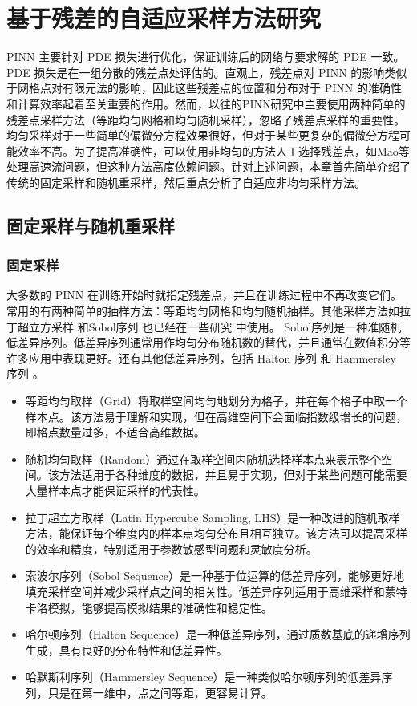 \chapter{基于残差的自适应采样方法研究}

PINN 主要针对 PDE 损失进行优化，保证训练后的网络与要求解的 PDE 一致。 PDE 损失是在一组分散的残差点处评估的。直观上，残差点对 PINN 的影响类似于网格点对有限元法的影响，因此这些残差点的位置和分布对于 PINN 的准确性和计算效率起着至关重要的作用。然而，以往的PINN研究中主要使用两种简单的残差点采样方法（等距均匀网格和均匀随机采样），忽略了残差点采样的重要性。均匀采样对于一些简单的偏微分方程效果很好，但对于某些更复杂的偏微分方程可能效率不高。为了提高准确性，可以使用非均匀的方法人工选择残差点，如Mao等 \cite{mao2020physics}处理高速流问题，但这种方法高度依赖问题。针对上述问题，本章首先简单介绍了传统的固定采样和随机重采样，然后重点分析了自适应非均匀采样方法。

\section{固定采样与随机重采样}

\subsection{固定采样}

大多数的 PINN 在训练开始时就指定残差点，并且在训练过程中不再改变它们。常用的有两种简单的抽样方法：等距均匀网格和均匀随机抽样。其他采样方法如拉丁超立方采样 \cite{stein1987large}和Sobol序列 \cite{sobol1967distribution}也已经在一些研究 \cite{raissi2019physics,pang2019fpinns}中使用。 Sobol序列是一种准随机低差异序列。低差异序列通常用作均匀分布随机数的替代，并且通常在数值积分等许多应用中表现更好。还有其他低差异序列，包括 Halton 序列 \cite{halton1960efficiency}和 Hammersley 序列 \cite{hammersley1964monte}。

\begin{itemize}
    \item 等距均匀取样（Grid）将取样空间均匀地划分为格子，并在每个格子中取一个样本点。该方法易于理解和实现，但在高维空间下会面临指数级增长的问题，即格点数量过多，不适合高维数据。
    \item 随机均匀取样（Random）通过在取样空间内随机选择样本点来表示整个空间。该方法适用于各种维度的数据，并且易于实现，但对于某些问题可能需要大量样本点才能保证采样的代表性。
    \item 拉丁超立方取样（Latin Hypercube Sampling, LHS）是一种改进的随机取样方法，能保证每个维度内的样本点均匀分布且相互独立。该方法可以提高采样的效率和精度，特别适用于参数敏感型问题和灵敏度分析。
    \item 索波尔序列（Sobol Sequence）是一种基于位运算的低差异序列，能够更好地填充采样空间并减少采样点之间的相关性。低差异序列适用于高维采样和蒙特卡洛模拟，能够提高模拟结果的准确性和稳定性。
    \item 哈尔顿序列（Halton Sequence）是一种低差异序列，通过质数基底的递增序列生成，具有良好的分布特性和低差异性。
    \item 哈默斯利序列（Hammersley Sequence）是一种类似哈尔顿序列的低差异序列，只是在第一维中，点之间等距，更容易计算。
\end{itemize}

